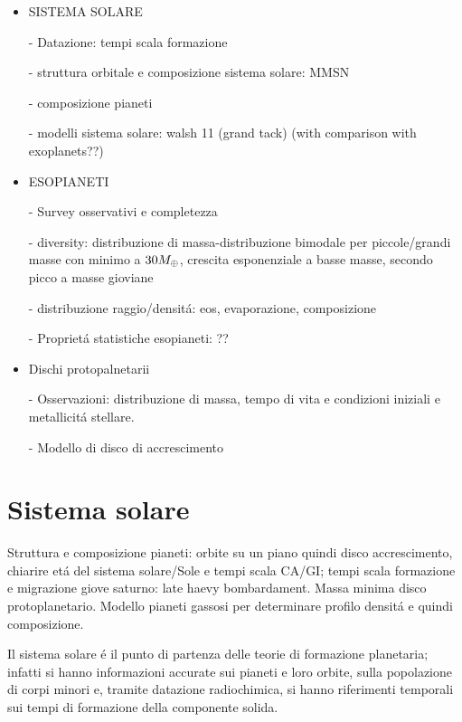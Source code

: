 \begin{workout}
\begin{itemize}
\item SISTEMA SOLARE
\item[-] Datazione: tempi scala formazione
\item[-] struttura orbitale e composizione sistema solare: MMSN
\item[-] composizione pianeti
\item[-] modelli sistema solare: walsh 11 (grand tack) (with comparison with exoplanets??)
\item ESOPIANETI
\item[-] Survey osservativi e completezza
\item[-] diversity: distribuzione di massa-distribuzione bimodale per piccole/grandi masse con minimo a $30M_{\oplus}$, crescita esponenziale a basse masse, secondo picco a masse gioviane
\item[-] distribuzione  raggio/densit\'a: eos, evaporazione, composizione
\item[-] Propriet\'a statistiche esopianeti: ??
\item Dischi protopalnetarii
\item[-] Osservazioni: distribuzione di massa, tempo di vita e condizioni iniziali e metallicit\'a stellare.
\item[-] Modello di disco di accrescimento
\end{itemize}
\end{workout}
{\let\clearpage\relax\let\cleardoublepage\relax
\chapter{Sistema solare}
}

\begin{workout}
Struttura e composizione pianeti: orbite su un piano quindi disco accrescimento, chiarire et\'a del sistema solare/Sole e tempi scala CA/GI; tempi scala formazione e migrazione giove saturno: late haevy bombardament. Massa minima disco protoplanetario. Modello pianeti gassosi per determinare profilo densit\'a e quindi composizione.
\end{workout}

Il sistema solare \'e il punto di partenza delle teorie di formazione planetaria; infatti si hanno informazioni accurate sui pianeti e loro orbite, sulla popolazione di corpi minori e, tramite datazione radiochimica, si hanno riferimenti temporali sui tempi di formazione della componente solida.

